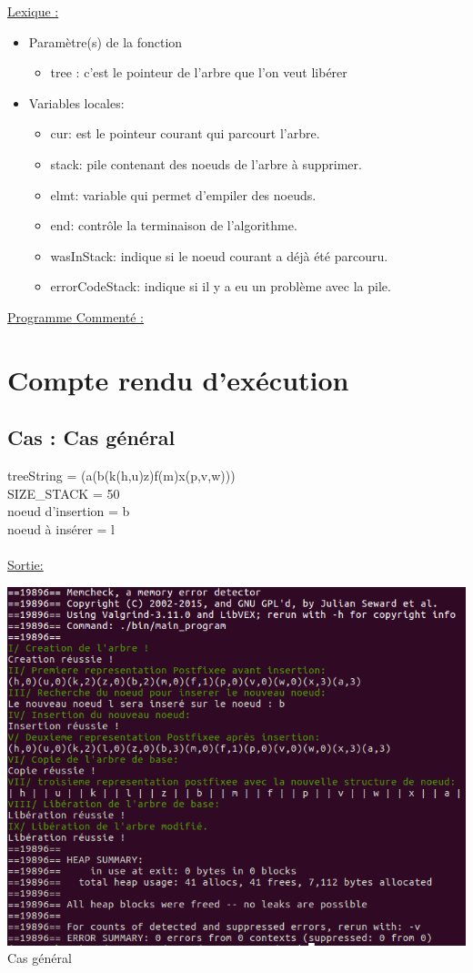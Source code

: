 \documentclass[a4paper]{article}
\begin{document}
\underline{Lexique :}
\begin{itemize}
\item Paramètre(s) de la fonction  
\begin{itemize}
\item tree : c'est le pointeur de l'arbre que l'on veut libérer
\end{itemize}
\item Variables locales:
\begin{itemize}
\item cur: est le pointeur courant qui parcourt l'arbre.
\item stack: pile contenant des noeuds de l'arbre à supprimer.
\item elmt: variable qui permet d'empiler des noeuds.
\item end: contrôle la terminaison de l'algorithme.
\item wasInStack: indique si le noeud courant a déjà été parcouru.
\item errorCodeStack: indique si il y a eu un problème avec la pile.
\end{itemize}
\end{itemize}
\underline{Programme Commenté :}



\section{Compte rendu d'exécution}

\subsection{Cas : Cas général}
treeString = (a(b(k(h,u)z)f(m)x(p,v,w)))
\\ 
SIZE\_STACK = 50
\\
noeud d'insertion = b
\\
noeud à insérer = l
\\
\\
\underline{Sortie: }
\begin{center}
\includegraphics[scale=0.6]{cas_general.png}
\\
Cas général
\end{center}
\end{document}

